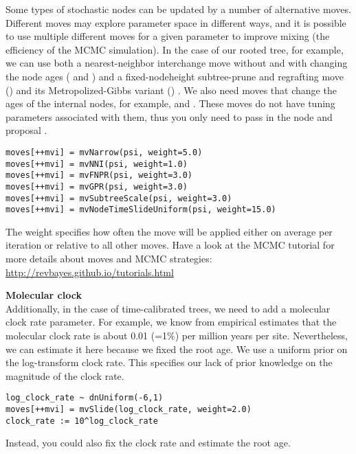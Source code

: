 \begin{framed}
Some types of stochastic nodes can be updated by a number of alternative moves. 
Different moves may explore parameter space in different ways, and it is possible to use multiple different moves for a given parameter to improve mixing (the efficiency of the MCMC simulation). 
In the case of our rooted tree, for example, we can use both a nearest-neighbor interchange move without and with changing the node ages ( and ) and a fixed-nodeheight subtree-prune and regrafting move () and its Metropolized-Gibbs variant () \citep{Hoehna2008,Hoehna2012}. 
We also need moves that change the ages of the internal nodes, for example,  and .
These moves do not have tuning parameters associated with them, thus you only need to pass in the  node and proposal . 
{\tt \begin{snugshade*}
\begin{lstlisting}
moves[++mvi] = mvNarrow(psi, weight=5.0)
moves[++mvi] = mvNNI(psi, weight=1.0)
moves[++mvi] = mvFNPR(psi, weight=3.0)
moves[++mvi] = mvGPR(psi, weight=3.0)
moves[++mvi] = mvSubtreeScale(psi, weight=3.0)
moves[++mvi] = mvNodeTimeSlideUniform(psi, weight=15.0)
\end{lstlisting}
\end{snugshade*}}
The weight specifies how often the move will be applied either on average per iteration or relative to all other moves.
Have a look at the MCMC tutorial for more details about moves and MCMC strategies: \href{http://revbayes.github.io/tutorials.html}{http://revbayes.github.io/tutorials.html}
\vspace{0.3cm}

\textbf{Molecular clock}\\
Additionally, in the case of time-calibrated trees, we need to add a molecular clock rate parameter.
For example, we know from empirical estimates that the molecular clock rate is about  0.01 (=1\%) per million years per site.
Nevertheless, we can estimate it here because we fixed the root age.
We use a uniform prior on the log-transform clock rate.
This specifies our lack of prior knowledge on the magnitude of the clock rate.
{\tt \begin{snugshade*}
\begin{lstlisting}
log_clock_rate ~ dnUniform(-6,1)
moves[++mvi] = mvSlide(log_clock_rate, weight=2.0)
clock_rate := 10^log_clock_rate
\end{lstlisting}
\end{snugshade*}}

Instead, you could also fix the clock rate and estimate the root age.

\end{framed}


